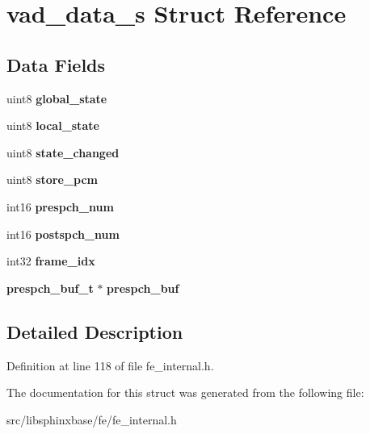 \section{vad\-\_\-data\-\_\-s Struct Reference}
\label{structvad__data__s}
\subsection*{Data Fields}
\begin{DoxyCompactItemize}
\item 
uint8 {\bfseries global\-\_\-state}\label{structvad__data__s_ac320029ecef22bd8856e7d12b10f3219}

\item 
uint8 {\bfseries local\-\_\-state}\label{structvad__data__s_af402eba40c394b61bb4d15a04e9f7a34}

\item 
uint8 {\bfseries state\-\_\-changed}\label{structvad__data__s_a3b62819ebfc3c5d06284d69b1604c289}

\item 
uint8 {\bfseries store\-\_\-pcm}\label{structvad__data__s_acfbbce04315dd3b9d3a109c76cd86e81}

\item 
int16 {\bfseries prespch\-\_\-num}\label{structvad__data__s_a6e7e7794d61eb74155058da0b9f40d78}

\item 
int16 {\bfseries postspch\-\_\-num}\label{structvad__data__s_abb3bf6c510b83b30056100fe4d281a49}

\item 
int32 {\bfseries frame\-\_\-idx}\label{structvad__data__s_a5862830d4be60206c4f7294f80c189c6}

\item 
{\bf prespch\-\_\-buf\-\_\-t} $\ast$ {\bfseries prespch\-\_\-buf}\label{structvad__data__s_a940abb6ae872a35dc8a7f405e5e7a6a6}

\end{DoxyCompactItemize}


\subsection{Detailed Description}


Definition at line 118 of file fe\-\_\-internal.\-h.



The documentation for this struct was generated from the following file\-:\begin{DoxyCompactItemize}
\item 
src/libsphinxbase/fe/fe\-\_\-internal.\-h\end{DoxyCompactItemize}
